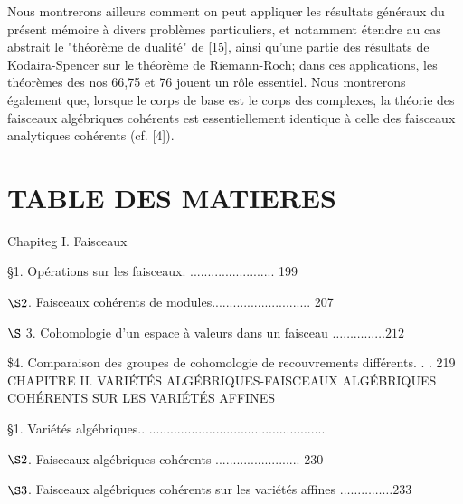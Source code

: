Nous montrerons ailleurs comment on peut appliquer les résultats généraux du présent mémoire à divers problèmes particuliers, et notamment étendre au cas abstrait le "théorème de dualité" de [15], ainsi qu'une partie des résultats de Kodaira-Spencer sur le théorème de Riemann-Roch; dans ces applications, les théorèmes des nos 66,75 et 76 jouent un rôle essentiel. Nous montrerons également que, lorsque le corps de base est le corps des complexes, la théorie des faisceaux algébriques cohérents est essentiellement identique à celle des faisceaux analytiques cohérents (cf. [4]).

\section{TABLE DES MATIERES}

Chapiteg I. Faisceaux

§1. Opérations sur les faisceaux. ........................ 199

$\S 2$. Faisceaux cohérents de modules............................ 207

$\S$ 3. Cohomologie d'un espace à valeurs dans un faisceau $\ldots \ldots \ldots \ldots \ldots 212$

\$4. Comparaison des groupes de cohomologie de recouvrements différents. . . 219 CHAPITRE II. VARIÉTÉS ALGÉBRIQUES-FAISCEAUX ALGÉBRIQUES COHÉRENTS SUR LES VARIÉTÉS AFFINES

§1. Variétés algébriques.. ..................................................

$\S 2$. Faisceaux algébriques cohérents ........................ 230

$\S 3$. Faisceaux algébriques cohérents sur les variétés affines $\ldots \ldots \ldots \ldots \ldots 233$

